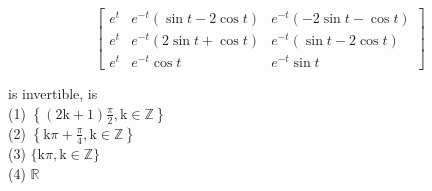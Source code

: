 \documentclass[10pt]{article}
\begin{document}
\[
\left[\begin{array}{ccc}
e^{t} & e^{-t}(\sin t-2 \cos t) & e^{-t}(-2 \sin t-\cos t) \\
e^{t} & e^{-t}(2 \sin t+\cos t) & e^{-t}(\sin t-2 \cos t) \\
e^{t} & e^{-t} \cos t & e^{-t} \sin t
\end{array}\right]
\]

is invertible, is\\
(1) \(\left\{(2 \mathrm{k}+1) \frac{\pi}{2}, \mathrm{k} \in \mathbb{Z}\right\}\)\\
(2) \(\left\{\mathrm{k} \pi+\frac{\pi}{4}, \mathrm{k} \in \mathbb{Z}\right\}\)\\
(3) \(\{\mathrm{k} \pi, \mathrm{k} \in \mathbb{Z}\}\)\\
(4) \(\mathbb{R}\)
\end{document}
